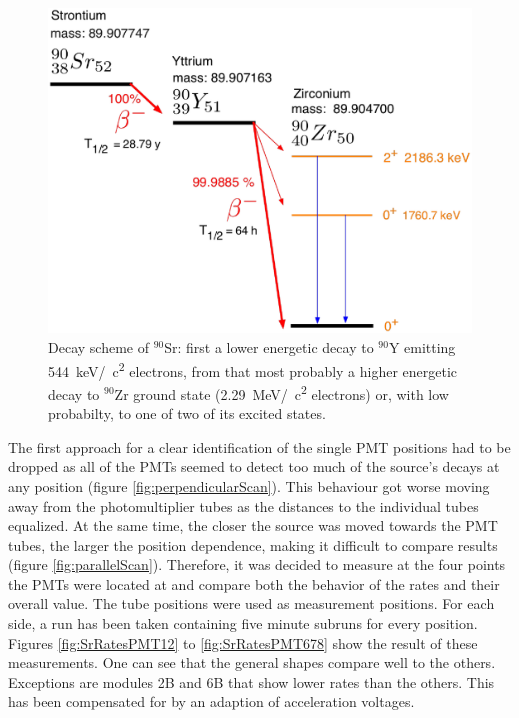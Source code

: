   \begin{figure}
  \centering
   	\includegraphics[width = 0.5 \textwidth]{graphics/cobalt/Sr90_decay.eps}
  	\caption[Cobalt Decay Scheme]{Decay scheme of $^{90}$Sr: first a lower energetic decay to $^{90}$Y emitting \SI{544}{\kilo\electronvolt}/\SI{}{\square c} electrons, from that most probably a higher energetic decay to $^{90}$Zr ground state (\SI{2.29}{\mega\electronvolt}/\SI{}{\square c} electrons) or, with low probabilty, to one of two of its excited states.}
  \end{figure}
  The first approach for a clear identification of the single PMT positions had to be dropped as all of the PMTs seemed to detect too much of the source's decays at any position (figure \ref{fig:perpendicularScan}).
  This behaviour got worse moving away from the photomultiplier tubes as the distances to the individual tubes equalized. At the same time, the closer the source was moved towards the PMT tubes, the larger the position dependence, making it difficult to compare results (figure \ref{fig:parallelScan}).
  Therefore, it was decided to measure at the four points the PMTs were located at and compare both the behavior of the rates and their overall value.
  The tube positions were used as measurement positions. For each side, a run has been taken containing five minute subruns for every position. Figures \ref{fig:SrRatesPMT12} to \ref{fig:SrRatesPMT678} show the result of these measurements. One can see that the general shapes compare well to the others. Exceptions are modules 2B and 6B that show lower rates than the others. This has been compensated for by an adaption of acceleration voltages.
 
